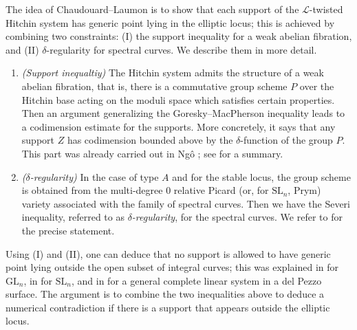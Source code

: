 \documentclass[11pt]{amsart}
\theoremstyle{plain}
\theoremstyle{definition}
\theoremstyle{remark}
\newcommand{\CL}{{\mathcal L}}
\begin{document}
The idea of Chaudouard--Laumon \cite{CL} is to show that each support of the $\CL$-twisted Hitchin system has generic point lying in the elliptic locus; this is achieved by combining two constraints: (I) the support inequality for a weak abelian fibration, and (II) $\delta$-regularity for spectral curves. We describe them in more detail.
\begin{enumerate}
    \item[(I)] \emph{(Support inequaltiy)} The Hitchin system admits the structure of a weak abelian fibration, that is, there is a commutative group scheme $P$ over the Hitchin base acting on the moduli space which satisfies certain properties. Then an argument generalizing the Goresky--MacPherson inequality leads to a codimension estimate for the supports. More concretely, it says that any support $Z$ has codimension bounded above by the $\delta$-function of the group $P$. This part was already carried out in Ng\^o \cite[Section 7]{Ngo}; see \cite[Section 1]{MS2} for a summary.
    \item[(II)] \emph{($\delta$-regularity)} In the case of type $A$ and for the stable locus, the group scheme is obtained from the multi-degree 0 relative Picard (or, for $\mathrm{SL}_n$, Prym) variety associated with the family of spectral curves. Then we have the Severi inequality, referred to as \emph{$\delta$-regularity}, for the spectral curves. We refer to \cite[Theorem 5.4.4]{dC_SL} for the precise statement.
\end{enumerate}

Using (I) and (II), one can deduce that no support is allowed to have generic point lying outside the open subset of integral curves; this was explained in \cite[Section 11]{CL} for $\mathrm{GL}_n$, in \cite[Section 6.2]{dC_SL} for $\mathrm{SL}_n$, and in \cite[Section 4.5]{MS2} for a general complete linear system in a del Pezzo surface. The argument is to combine the two inequalities above to deduce a numerical contradiction if there is a support that appears outside the elliptic locus.

\end{document}
